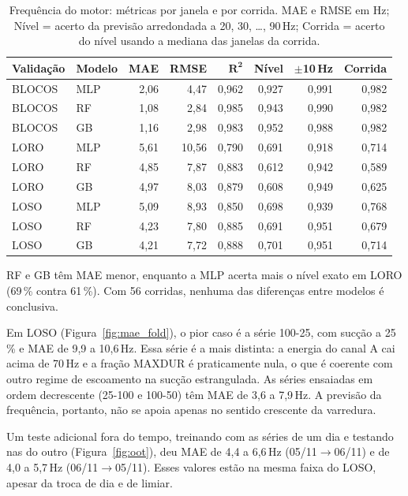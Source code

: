 \documentclass[12pt]{article}
\begin{document}
\begin{table}[htbp]
	\centering
	\caption{Frequência do motor: métricas por janela e por corrida. MAE e RMSE em Hz; Nível = acerto da previsão arredondada a 20, 30, \ldots, 90\,Hz; Corrida = acerto do nível usando a mediana das janelas da corrida.}
	\label{tab:freq}
	\small
	\begin{tabular}{llrrrrrr}
		\toprule
		\textbf{Validação} & \textbf{Modelo} & \textbf{MAE} & \textbf{RMSE} & \(\boldsymbol{R^2}\) & \textbf{Nível} & \(\boldsymbol{\pm}\)\textbf{10\,Hz} & \textbf{Corrida} \\
		\midrule
		BLOCOS & MLP & 2,06 & 4,47 & 0,962 & 0,927 & 0,991 & 0,982 \\
		BLOCOS & RF & 1,08 & 2,84 & 0,985 & 0,943 & 0,990 & 0,982 \\
		BLOCOS & GB & 1,16 & 2,98 & 0,983 & 0,952 & 0,988 & 0,982 \\
		\midrule
		LORO & MLP & 5,61 & 10,56 & 0,790 & 0,691 & 0,918 & 0,714 \\
		LORO & RF & 4,85 & 7,87 & 0,883 & 0,612 & 0,942 & 0,589 \\
		LORO & GB & 4,97 & 8,03 & 0,879 & 0,608 & 0,949 & 0,625 \\
		\midrule
		LOSO & MLP & 5,09 & 8,93 & 0,850 & 0,698 & 0,939 & 0,768 \\
		LOSO & RF & 4,23 & 7,80 & 0,885 & 0,691 & 0,951 & 0,679 \\
		LOSO & GB & 4,21 & 7,72 & 0,888 & 0,701 & 0,951 & 0,714 \\
		\bottomrule
	\end{tabular}
\end{table}

RF e GB têm MAE menor, enquanto a MLP acerta mais o nível exato em LORO (69\,\% contra 61\,\%). Com 56 corridas, nenhuma das diferenças entre modelos é conclusiva.

Em LOSO (Figura~\ref{fig:mae_fold}), o pior caso é a série 100-25, com sucção a 25\,\% e MAE de 9,9 a 10,6\,Hz. Essa série é a mais distinta: a energia do canal A cai acima de 70\,Hz e a fração MAXDUR é praticamente nula, o que é coerente com outro regime de escoamento na sucção estrangulada. As séries ensaiadas em ordem decrescente (25-100 e 100-50) têm MAE de 3,6 a 7,9\,Hz. A previsão da frequência, portanto, não se apoia apenas no sentido crescente da varredura.

Um teste adicional fora do tempo, treinando com as séries de um dia e testando nas do outro (Figura~\ref{fig:oot}), deu MAE de 4,4 a 6,6\,Hz (05/11\(\rightarrow\)06/11) e de 4,0 a 5,7\,Hz (06/11\(\rightarrow\)05/11). Esses valores estão na mesma faixa do LOSO, apesar da troca de dia e de limiar.
\end{document}
